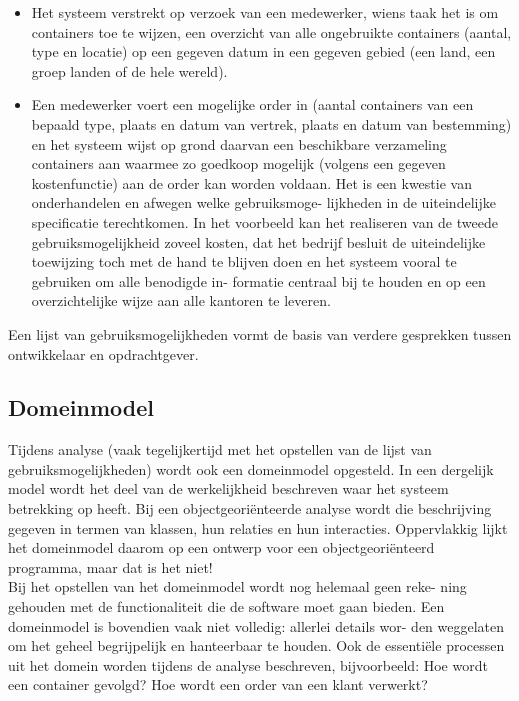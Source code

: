 \documentclass{article}
\begin{document}
	\begin{itemize}
		\item Het systeem verstrekt op verzoek van een medewerker, wiens taak het
		is om containers toe te wijzen, een overzicht van alle ongebruikte containers (aantal, type en locatie) op een gegeven datum in een gegeven
		gebied (een land, een groep landen of de hele wereld).
		\item Een medewerker voert een mogelijke order in (aantal containers van
		een bepaald type, plaats en datum van vertrek, plaats en datum van
		bestemming) en het systeem wijst op grond daarvan een beschikbare
		verzameling containers aan waarmee zo goedkoop mogelijk (volgens
		een gegeven kostenfunctie) aan de order kan worden voldaan.
		Het is een kwestie van onderhandelen en afwegen welke gebruiksmoge-
		lijkheden in de uiteindelijke specificatie terechtkomen. In het voorbeeld
		kan het realiseren van de tweede gebruiksmogelijkheid zoveel kosten,
		dat het bedrijf besluit de uiteindelijke toewijzing toch met de hand te
		blijven doen en het systeem vooral te gebruiken om alle benodigde in-
		formatie centraal bij te houden en op een overzichtelijke wijze aan alle
		kantoren te leveren.	
	\end{itemize}
	
	Een lijst van gebruiksmogelijkheden vormt de basis van verdere
	gesprekken tussen ontwikkelaar en opdrachtgever.
	
	\subsection{Domeinmodel}
	
	Tijdens analyse (vaak tegelijkertijd met het opstellen van de lijst van
	gebruiksmogelijkheden) wordt ook een domeinmodel opgesteld. In een
	dergelijk model wordt het deel van de werkelijkheid beschreven waar
	het systeem betrekking op heeft. Bij een objectgeoriënteerde analyse
	wordt die beschrijving gegeven in termen van klassen, hun relaties en
	hun interacties. Oppervlakkig lijkt het domeinmodel daarom op een
	ontwerp voor een objectgeoriënteerd programma, maar dat is het niet! \\
	Bij het opstellen van het domeinmodel wordt nog helemaal geen reke-
	ning gehouden met de functionaliteit die de software moet gaan bieden.
	Een domeinmodel is bovendien vaak niet volledig: allerlei details wor-
	den weggelaten om het geheel begrijpelijk en hanteerbaar te houden.
	Ook de essentiële processen uit het domein worden tijdens de analyse
	beschreven, bijvoorbeeld: Hoe wordt een container gevolgd? Hoe wordt
	een order van een klant verwerkt? \\
	
\end{document}
